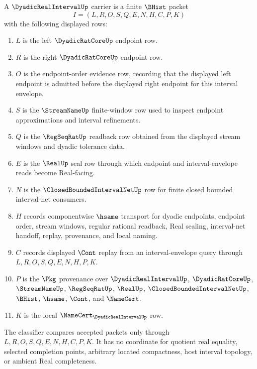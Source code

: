 \begin{definition}
\label{def:dyadic-real-interval-carrier}
A $\DyadicRealIntervalUp$ carrier is a finite $\BHist$ packet
$$
I=(L,R,O,S,Q,E,N,H,C,P,K)
$$
with the following displayed rows:
\begin{enumerate}
\item $L$ is the left $\DyadicRatCoreUp$ endpoint row.
\item $R$ is the right $\DyadicRatCoreUp$ endpoint row.
\item $O$ is the endpoint-order evidence row, recording that the displayed left endpoint is admitted before the displayed right endpoint for this interval envelope.
\item $S$ is the $\StreamNameUp$ finite-window row used to inspect endpoint approximations and interval refinements.
\item $Q$ is the $\RegSeqRatUp$ readback row obtained from the displayed stream windows and dyadic tolerance data.
\item $E$ is the $\RealUp$ seal row through which endpoint and interval-envelope reads become Real-facing.
\item $N$ is the $\ClosedBoundedIntervalNetUp$ row for finite closed bounded interval-net consumers.
\item $H$ records componentwise $\hsame$ transport for dyadic endpoints, endpoint order, stream windows, regular rational readback, Real sealing, interval-net handoff, replay, provenance, and local naming.
\item $C$ records displayed $\Cont$ replay from an interval-envelope query through $L,R,O,S,Q,E,N,H,P,K$.
\item $P$ is the $\Pkg$ provenance over $\DyadicRealIntervalUp$, $\DyadicRatCoreUp$, $\StreamNameUp$, $\RegSeqRatUp$, $\RealUp$, $\ClosedBoundedIntervalNetUp$, $\BHist$, $\hsame$, $\Cont$, and $\NameCert$.
\item $K$ is the local $\NameCert_{\DyadicRealIntervalUp}$ row.
\end{enumerate}
The classifier compares accepted packets only through $L,R,O,S,Q,E,N,H,C,P,K$. It has no coordinate for quotient real equality, selected completion points, arbitrary located compactness, host interval topology, or ambient Real completeness.
\end{definition}

